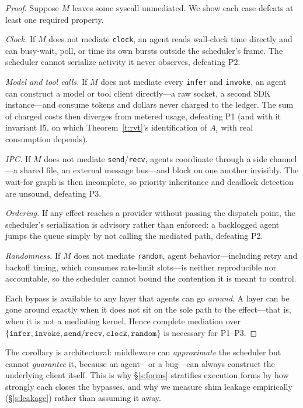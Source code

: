 \documentclass[letterpaper,11pt,leqno]{article}
\begin{document}
\begin{proof}
Suppose $M$ leaves some syscall unmediated. We show each case defeats at least one required property.

\emph{Clock.} If $M$ does not mediate \texttt{clock}, an agent reads wall-clock time directly and can busy-wait, poll, or time its own bursts outside the scheduler's frame. The scheduler cannot serialize activity it never observes, defeating P2.

\emph{Model and tool calls.} If $M$ does not mediate every \texttt{infer} and \texttt{invoke}, an agent can construct a model or tool client directly---a raw socket, a second SDK instance---and consume tokens and dollars never charged to the ledger. The sum of charged costs then diverges from metered usage, defeating P1 (and with it invariant I5, on which Theorem~\ref{t:rvt}'s identification of $A_i$ with real consumption depends).

\emph{IPC.} If $M$ does not mediate \texttt{send}/\texttt{recv}, agents coordinate through a side channel---a shared file, an external message bus---and block on one another invisibly. The wait-for graph is then incomplete, so priority inheritance and deadlock detection are unsound, defeating P3.

\emph{Ordering.} If any effect reaches a provider without passing the dispatch point, the scheduler's serialization is advisory rather than enforced: a backlogged agent jumps the queue simply by not calling the mediated path, defeating P2.

\emph{Randomness.} If $M$ does not mediate \texttt{random}, agent behavior---including retry and backoff timing, which consumes rate-limit slots---is neither reproducible nor accountable, so the scheduler cannot bound the contention it is meant to control.

Each bypass is available to any layer that agents can go \emph{around}. A layer can be gone around exactly when it does not sit on the sole path to the effect---that is, when it is not a mediating kernel. Hence complete mediation over $\{\texttt{infer}, \texttt{invoke}, \texttt{send}/\texttt{recv}, \texttt{clock}, \texttt{random}\}$ is necessary for P1--P3.
\end{proof}

The corollary is architectural: middleware can \emph{approximate} the scheduler but cannot \emph{guarantee} it, because an agent---or a bug---can always construct the underlying client itself. This is why \S\ref{s:forms} stratifies execution forms by how strongly each closes the bypasses, and why we measure shim leakage empirically (\S\ref{s:leakage}) rather than assuming it away.
\end{document}
